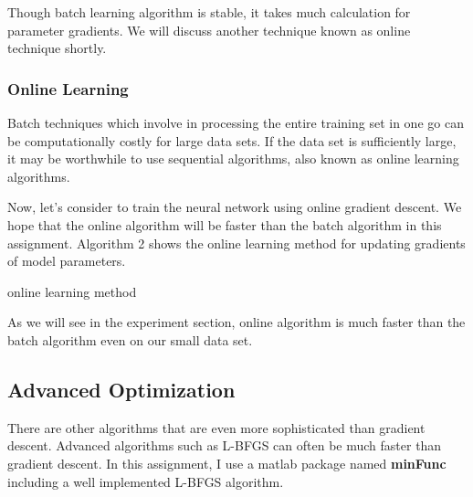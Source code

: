 Though batch learning algorithm is stable, it takes much calculation for parameter gradients. We will discuss another technique known as online technique shortly.

\subsubsection{Online Learning}
Batch techniques which involve in processing the entire training set in one go can be computationally costly for large data sets. If the data set is sufficiently large, it may be worthwhile to use sequential algorithms, also known as online learning algorithms.

Now, let's consider to train the neural network using online gradient descent. We hope that the online algorithm will be faster than the batch algorithm in this assignment. Algorithm 2 shows the online learning method for updating gradients of model parameters.

\begin{algorithm}
\caption{online learning method}
\begin{algorithmic}
\REPEAT
{}
\end{algorithmic}
\end{algorithm}

As we will see in the experiment section, online algorithm is much faster than the batch algorithm even on our small data set.

\subsection{Advanced Optimization}
There are other algorithms that are even more sophisticated than gradient descent. Advanced algorithms such as L-BFGS can often be much faster than gradient descent. In this assignment, I use a matlab package named \textbf{minFunc} including a well implemented L-BFGS algorithm.


